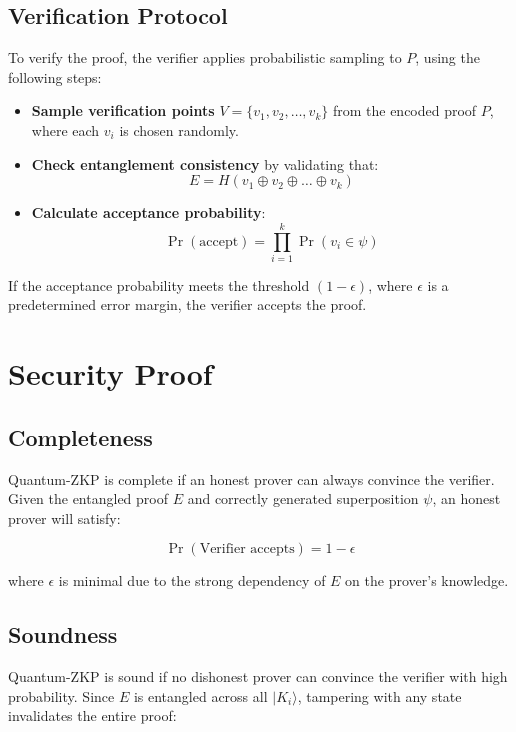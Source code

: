 \documentclass{article.cls}
\begin{document}
\subsection{Verification Protocol}
To verify the proof, the verifier applies probabilistic sampling to $P$, using the following steps:
\begin{itemize}
    \item \textbf{Sample verification points} $V = \{v_1, v_2, \dots, v_k\}$ from the encoded proof $P$, where each $v_i$ is chosen randomly.
    \item \textbf{Check entanglement consistency} by validating that:
    \begin{equation}
    E = H(v_1 \oplus v_2 \oplus \dots \oplus v_k)
    \end{equation}
    \item \textbf{Calculate acceptance probability}:
    \begin{equation}
    \Pr(\text{accept}) = \prod_{i=1}^k \Pr(v_i \in \psi)
    \end{equation}
\end{itemize}

If the acceptance probability meets the threshold $( 1 - \epsilon )$, where $\epsilon$ is a predetermined error margin, the verifier accepts the proof.

\section{Security Proof}
\subsection{Completeness}
Quantum-ZKP is complete if an honest prover can always convince the verifier. Given the entangled proof $E$ and correctly generated superposition $\psi$, an honest prover will satisfy:

\begin{equation}
\Pr(\text{Verifier accepts}) = 1 - \epsilon
\end{equation}

where $\epsilon$ is minimal due to the strong dependency of $E$ on the prover's knowledge.

\subsection{Soundness}
Quantum-ZKP is sound if no dishonest prover can convince the verifier with high probability. Since $E$ is entangled across all $\vert K_i \rangle$, tampering with any state invalidates the entire proof:
\end{document}
